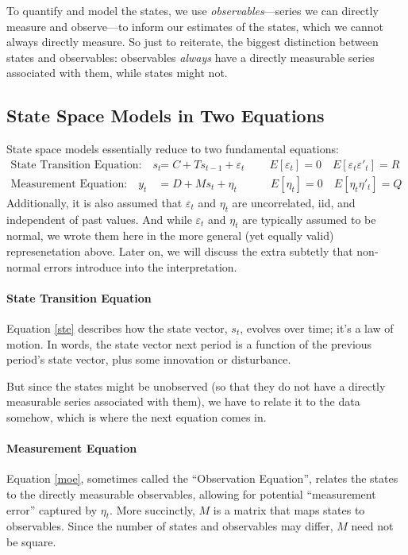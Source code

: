 \documentclass[a4paper,12pt]{article}
\begin{document}
To quantify and model the states, we use \emph{observables}---series we can directly measure and observe---to inform our estimates of the states, which we cannot always directly measure. So just to reiterate, the biggest distinction between states and observables: observables \emph{always} have a directly measurable series associated with them, while states might not.


\subsection{State Space Models in Two Equations}

State space models essentially reduce to two fundamental equations:
\begin{align}
  \text{State Transition Equation:} \quad
    s_{t} &= C + T s_{t-1} + \varepsilon_{t} \label{ste}\
    \quad\quad E[\varepsilon_t] = 0
    \quad E[\varepsilon_t \varepsilon'_t] =  R \\
  \text{Measurement Equation:} \quad
    y_{t} &= D + M s_{t} + \eta_{t} \label{moe}
    \quad\qquad E[\eta_t] =  0 
    \quad E[\eta_t \eta'_t] =  Q 
\end{align}
Additionally, it is also assumed that $\varepsilon_t$ and $\eta_t$ are uncorrelated, iid, and independent of past values. And while $\varepsilon_t$ and $\eta_t$ are typically assumed to be normal, we wrote them here in the more general (yet equally valid) represenetation above. Later on, we will discuss the extra subtetly that non-normal errors introduce into the interpretation.


\paragraph{State Transition Equation} Equation \ref{ste} describes how the state vector, $s_t$, evolves over time; it's a law of motion. In words, the state vector next period is a function of the previous period's state vector, plus some innovation or disturbance. 

But since the states might be unobserved (so that they do not have a directly measurable series associated with them), we have to relate it to the data somehow, which is where the next equation comes in.

\paragraph{Measurement Equation} Equation \ref{moe}, sometimes called the ``Observation Equation'', relates the states to the directly measurable observables, allowing for potential ``measurement error'' captured by $\eta_t$. More succinctly, $M$ is a matrix that maps states to observables. Since the number of states and observables may differ, $M$ need not be square.
\end{document}
